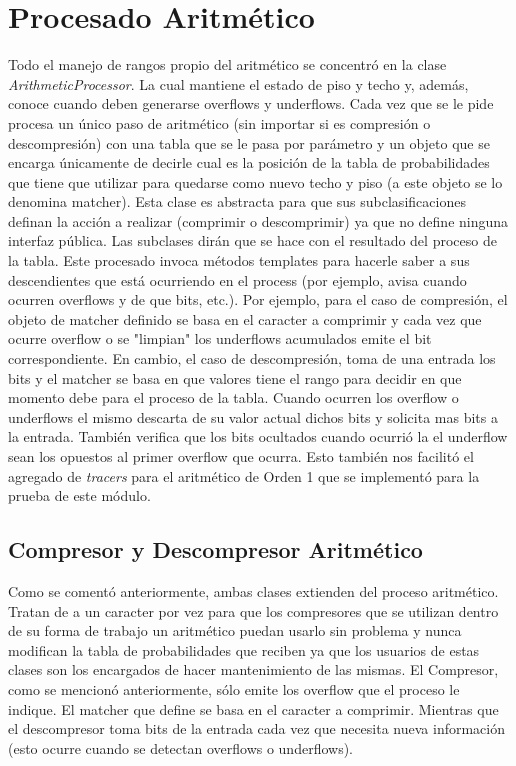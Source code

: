 \section{Procesado Aritmético}
Todo el manejo de rangos propio del aritmético se concentró en la clase \textit{ArithmeticProcessor}. La cual mantiene el estado de piso y techo y, además, conoce cuando deben generarse overflows y underflows. Cada vez que se le pide procesa un único paso de aritmético (sin importar si es compresión o descompresión) con una tabla que se le pasa por parámetro y un objeto que se encarga únicamente de decirle cual es la posición de la tabla de probabilidades que tiene que utilizar para quedarse como nuevo techo y piso (a este objeto se lo denomina matcher).
Esta clase es abstracta para que sus subclasificaciones definan la acción a realizar (comprimir o descomprimir) ya que no define ninguna interfaz pública. Las subclases dirán que se hace con el resultado del proceso de la tabla. Este procesado invoca métodos templates para hacerle saber a sus descendientes que está ocurriendo en el process (por ejemplo, avisa cuando ocurren overflows y de que bits, etc.). 
Por ejemplo, para el caso de compresión, el objeto de matcher definido se basa en el caracter a comprimir y cada vez que ocurre overflow o se "limpian" los underflows acumulados emite el bit correspondiente.
En cambio, el caso de descompresión, toma de una entrada los bits y el matcher se basa en que valores tiene el rango para decidir en que momento debe para el proceso de la tabla. Cuando ocurren los overflow o underflows el mismo descarta de su valor actual dichos bits y solicita mas bits a la entrada. También verifica que los bits ocultados cuando ocurrió la el underflow sean los opuestos al primer overflow que ocurra.
Esto también nos facilitó el agregado de \textit{tracers} para el aritmético de Orden 1 que se implementó para la prueba de este módulo.
\subsection{Compresor y Descompresor Aritmético}
Como se comentó anteriormente, ambas clases extienden del proceso aritmético. Tratan de a un caracter por vez para que los compresores que se utilizan dentro de su forma de trabajo un aritmético puedan usarlo sin problema y nunca modifican la tabla de probabilidades que reciben ya que los usuarios de estas clases son los encargados de hacer mantenimiento de las mismas.
El Compresor, como se mencionó anteriormente, sólo emite los overflow que el proceso le indique. El matcher que define se basa en el caracter a comprimir. Mientras que el descompresor toma bits de la entrada cada vez que necesita nueva información (esto ocurre cuando se detectan overflows o underflows).

